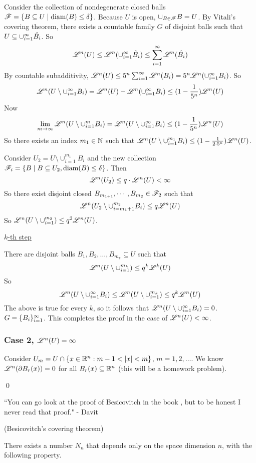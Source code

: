 \documentclass[x11names,reqno,14pt]{extarticle}
\newcommand{\seq}[2][\oo]{_{#2 = 1}^#1}
\newcommand{\cupi}[1][\oo]{\cup\seq[#1]{i}}
\DeclareMathOperator{\diam}{diam}
\begin{document}
Consider the collection of nondegenerate closed balls $\ms{F} = \{ B \subseteq U \mid \diam(B)\leq\delta\}$. Because $U$ is open, $\cup_{B\in\mathscr{F}}B = U$. By Vitali's covering theorem, there exists a countable family $G$ of disjoint balls such that $U\subseteq\cupi\hat{B_i}$. So
\[
\ms{L}^n(U)\leq\ms{L}^n(\cupi\hat{B}_i) \leq \sum\seq{i}\ms{L}^n(\hat{B_i})
\]
By countable subadditivity, $\ms{L}^n(U) \leq 5^n\sum\seq{i}\ms{L}^n(B_i) = 5^n\ms{L}^n(\cupi B_i)$. So
\[
\ms{L}^n(U\setminus\cupi B_i) = \ms{L}^n(U) - \ms{L}^n(\cupi B_i) \leq (1 - \frac{1}{5^n})\ms{L}^n(U)
\]
Now
\[
\lim_{m\to\oo}\ms{L}^n(U\setminus\cupi[m]B_i) = \ms{L}^n(U\setminus\cupi B_i) \leq (1 - \frac{1}{5^n})\ms{L}^n(U)
\]
So there exists an index $m_1 \in \mathbb{N}$ such that $\mathscr{L}^n(U \setminus \cup_{i=1}^{m_1} B_i ) \leq (1 - \frac{1}{2\cdot 5^n})\mathscr{L}^n(U)$. 

Consider $U_2 = U \setminus \cup_{i=1}^{m_1}B_i$ and the new collection $\ms{F}_i = \{B\mid B \subseteq U_2, \diam(B)\leq\delta\}$. Then 
\[
\mathscr{L}^n(U_2) \leq q\cdot\mathscr{L}^n(U) < \infty
\]
So there exist disjoint closed $B_{m_{1 + 1}},\cdots, B_{m_2} \in \mathscr{F}_2$ such that
\[
\mathscr{L}^n(U_2 \setminus \cup_{i=m_1 + 1}^{m_2}B_i) \leq q\mathscr{L}^n(U)
\]
So $\mathscr{L}^n(U\setminus\cup_{i=1}^{m_2})\leq q^2\mathscr{L}^n(U)$. 

\underline{$k$-th step}

There are disjoint balls $B_1, B_2, \dots, B_{m_k} \subseteq U$ such that
\[
\mathscr{L}^n(U\setminus \cup_{i=1}^{m_k}) \leq q^k\mathscr{L}^k(U)
\]
So
\[
\ms{L}^n(U \setminus \cupi B_i) \leq \ms{L}^n(U\setminus\cup_{i=1}^{m_k}) \leq q^k\ms{L}^n(U)
\]
The above is true for every $k$, so it follows that $\ms{L}^n(U \setminus \cupi B_i) = 0$. $G = \{B_i\}\seq{i}$. This completes the proof in the case of $\mathscr{L}^n(U)<\infty$. 

\subsubsection*{Case 2, $\mathscr{L}^n(U) = \infty$}

Consider $U_m = U \cap \{x\in \mathbb{R}^n: m - 1 < |x| < m\}$, $m =1, 2, \dots$. We know $\mathscr{L}^n(\partial B_r(x)) = 0$ for all $B_r(x) \subseteq \mathbb{R}^n$ (this will be a homework problem). 

\qed

``You can go look at the proof of Besicovitch in the book , but to be honest I never read that proof." - Davit


\thm (Besicovitch's covering theorem) 

There exists a number $N_n$ that depends only on the space dimension $n$, with the following property. 
\end{document}
